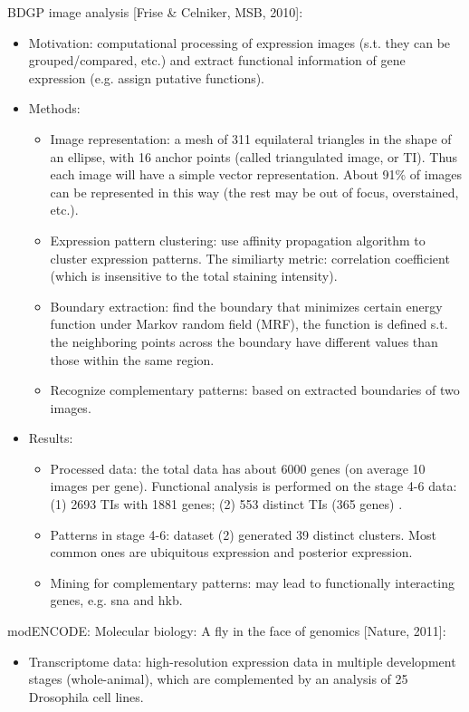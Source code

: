 \documentclass{report}
\begin{document}
\begin{enumerate}
	BDGP image analysis [Frise \& Celniker, MSB, 2010]:
	\begin{itemize}
		\item Motivation: computational processing of expression images (s.t. they can be grouped/compared, etc.) and extract functional information of gene expression (e.g. assign putative functions). 
		
		\item Methods: 
		\begin{itemize}
			\item Image representation: a mesh of 311 equilateral triangles in the shape of an ellipse, with 16 anchor points (called triangulated image, or TI). Thus each image will have a simple vector representation. About 91\% of images can be represented in this way (the rest may be out of focus, overstained, etc.). 
			\item Expression pattern clustering: use affinity propagation algorithm to cluster expression patterns. The similiarty metric: correlation coefficient (which is insensitive to the total staining intensity). 
			\item Boundary extraction: find the boundary that minimizes certain energy function under Markov random field (MRF), the function is defined s.t. the neighboring points across the boundary have different values than those within the same region. 
			\item Recognize complementary patterns: based on extracted boundaries of two images. 
		\end{itemize}
		
		\item Results: 
		\begin{itemize}
			\item Processed data: the total data has about 6000 genes (on average 10 images per gene). Functional analysis is performed on the stage 4-6 data: (1) 2693 TIs with 1881 genes; (2) 553 distinct TIs (365 genes) .
			\item Patterns in stage 4-6: dataset (2) generated 39 distinct clusters. Most common ones are ubiquitous expression and posterior expression. 
			\item Mining for complementary patterns: may lead to functionally interacting genes, e.g. sna and hkb. 
		\end{itemize}
	\end{itemize}
	
	modENCODE: Molecular biology: A fly in the face of genomics [Nature, 2011]:
	\begin{itemize}
		\item Transcriptome data: high-resolution expression data in multiple development stages (whole-animal), which are complemented by an analysis of 25 Drosophila cell lines. 
		

\end{itemize}
\end{enumerate}
\end{document}

